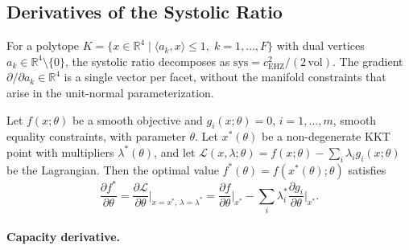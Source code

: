 
\subsection{Derivatives of the Systolic Ratio}
\label{sec:sys-optimization}

For a polytope $K = \{x \in \mathbb{R}^4 \mid \langle a_k, x \rangle \le 1,\; k=1,\dots,F\}$
with dual vertices $a_k \in \mathbb{R}^4 \setminus \{0\}$,
the systolic ratio decomposes as
$\mathrm{sys} = c_{\mathrm{EHZ}}^2 / (2\,\mathrm{vol})$.
The gradient $\partial/\partial a_k \in \mathbb{R}^4$ is a single vector
per facet, without the manifold constraints that arise in the unit-normal
parameterization.

\begin{theorem*}
Let $f(x;\theta)$ be a smooth objective and $g_i(x;\theta) = 0$,
$i = 1,\dots,m$, smooth equality constraints, with parameter $\theta$.
Let $x^*(\theta)$ be a non-degenerate KKT point with multipliers
$\lambda^*(\theta)$, and let
$\mathcal{L}(x,\lambda;\theta) = f(x;\theta) - \sum_i \lambda_i g_i(x;\theta)$
be the Lagrangian.
Then the optimal value $f^*(\theta) = f(x^*(\theta);\theta)$ satisfies
\[
  \frac{\partial f^*}{\partial \theta}
  = \frac{\partial \mathcal{L}}{\partial \theta}\bigg|_{x=x^*,\,\lambda=\lambda^*}
  = \frac{\partial f}{\partial \theta}\bigg|_{x^*}
    - \sum_i \lambda_i^* \frac{\partial g_i}{\partial \theta}\bigg|_{x^*}.
\]
\end{theorem*}

\paragraph{Capacity derivative.}

